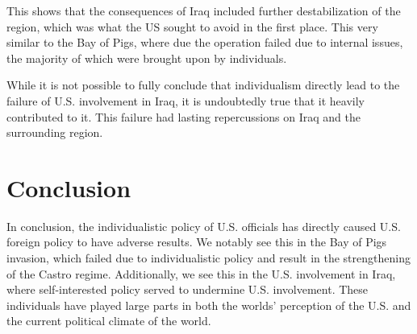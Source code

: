 \documentclass[12pt]{article}
\begin{document}
        This shows that the consequences of Iraq included further destabilization of the region, which was what the US sought to avoid in the first place. This very similar to the Bay of Pigs, where due the operation failed due to internal issues, the majority of which were brought upon by individuals.  

        While it is not possible to fully conclude that individualism directly lead to the failure of U.S. involvement in Iraq, it is undoubtedly true that it heavily contributed to it. This failure had lasting repercussions on Iraq and the surrounding region.
            
\section{Conclusion}
        In conclusion, the individualistic policy of U.S. officials has directly caused U.S. foreign policy to have adverse results. We notably see this in the Bay of Pigs invasion, which failed due to individualistic policy and result in the strengthening of the Castro regime. Additionally, we see this in the U.S. involvement in Iraq, where self-interested policy served to undermine U.S. involvement. These individuals have played large parts in both the worlds' perception of the U.S. and the current political climate of the world.


\pagebreak

\printbibliography[heading=bibintoc]
\end{document}
